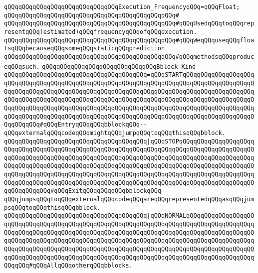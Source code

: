 \newline
\verb|qQQqqQQqqQQqqQQqqQQqqQQqqQQqqQQqExecution_FrequencyqQQq=qQQqFloat;|\newline
\verb|qQQqqQQqqQQqqQQqqQQqqQQqqQQqqQQqqQQqqQQqqQQqqQQq#|\newline
\verb|qQQqqQQqqQQqqQQqqQQqqQQqqQQqqQQqqQQqqQQqqQQqqQQq#qQQqUsedqQQqtoqQQqrepresentqQQq(estimated)qQQqfrequencyqQQqofqQQqexecution.|\newline
\verb|qQQqqQQqqQQqqQQqqQQqqQQqqQQqqQQqqQQqqQQqqQQqqQQq#qQQqWeqQQquseqQQqfloatsqQQqbecauseqQQqsomeqQQqstaticqQQqprediction|\newline
\verb|qQQqqQQqqQQqqQQqqQQqqQQqqQQqqQQqqQQqqQQqqQQqqQQq#qQQqmethodsqQQqproduceqQQqsuch.|\newline
\newline
\newline
\verb|qQQqqQQqqQQqqQQqqQQqqQQqqQQqqQQqBblock_Kind|\newline
\verb|qQQqqQQqqQQqqQQqqQQqqQQqqQQqqQQqqQQqqQQq=qQQqSTARTqQQqqQQqqQQqqQQqqQQqqQQqqQQqqQQqqQQqqQQqqQQqqQQqqQQqqQQqqQQqqQQqqQQqqQQqqQQqqQQqqQQqqQQqqQQqqQQqqQQqqQQqqQQqqQQqqQQqqQQqqQQqqQQqqQQqqQQqqQQqqQQqqQQqqQQqqQQqqQQqqQQqqQQqqQQqqQQqqQQqqQQqqQQqqQQqqQQqqQQqqQQqqQQqqQQqqQQqqQQqqQQqqQQqqQQqqQQqqQQqqQQqqQQqqQQqqQQqqQQqqQQqqQQqqQQqqQQqqQQqqQQqqQQqqQQqqQQqqQQqqQQqqQQqqQQqqQQqqQQqqQQqqQQqqQQqqQQqqQQqqQQqqQQqqQQqqQQqqQQqqQQqqQQqqQQqqQQqqQQq#qQQqEntryqQQqqQQqbblockqQQq--qQQqexternalqQQqcodeqQQqmightqQQqjumpqQQqtoqQQqthisqQQqbblock.|\newline
\verb|qQQqqQQqqQQqqQQqqQQqqQQqqQQqqQQqqQQqqQQq|\verb#|qQQqSTOPqQQqqQQqqQQqqQQqqQQqqQQqqQQqqQQqqQQqqQQqqQQqqQQqqQQqqQQqqQQqqQQqqQQqqQQqqQQqqQQqqQQqqQQqqQQqqQQqqQQqqQQqqQQqqQQqqQQqqQQqqQQqqQQqqQQqqQQqqQQqqQQqqQQqqQQqqQQqqQQqqQQqqQQqqQQqqQQqqQQqqQQqqQQqqQQqqQQqqQQqqQQqqQQqqQQqqQQqqQQqqQQqqQQqqQQqqQQqqQQqqQQqqQQqqQQqqQQqqQQqqQQqqQQqqQQqqQQqqQQqqQQqqQQqqQQqqQQqqQQqqQQqqQQqqQQqqQQqqQQqqQQqqQQqqQQqqQQqqQQqqQQqqQQqqQQqqQQqqQQqqQQqqQQqqQQqqQQqqQQqqQQq#\verb|#qQQqExitqQQqqQQqqQQqbblockqQQq--qQQqjumpsqQQqtoqQQqexternalqQQqcodeqQQqareqQQqrepresentedqQQqasqQQqjumpsqQQqtoqQQqthisqQQqbblock.|\newline
\verb|qQQqqQQqqQQqqQQqqQQqqQQqqQQqqQQqqQQqqQQq|\verb#|qQQqNORMALqQQqqQQqqQQqqQQqqQQqqQQqqQQqqQQqqQQqqQQqqQQqqQQqqQQqqQQqqQQqqQQqqQQqqQQqqQQqqQQqqQQqqQQqqQQqqQQqqQQqqQQqqQQqqQQqqQQqqQQqqQQqqQQqqQQqqQQqqQQqqQQqqQQqqQQqqQQqqQQqqQQqqQQqqQQqqQQqqQQqqQQqqQQqqQQqqQQqqQQqqQQqqQQqqQQqqQQqqQQqqQQqqQQqqQQqqQQqqQQqqQQqqQQqqQQqqQQqqQQqqQQqqQQqqQQqqQQqqQQqqQQqqQQqqQQqqQQqqQQqqQQqqQQqqQQqqQQqqQQqqQQqqQQqqQQqqQQqqQQqqQQqqQQqqQQqqQQqqQQqqQQqqQQqqQQqqQQq#\verb|#qQQqAllqQQqotherqQQqbblocks.|\newline
